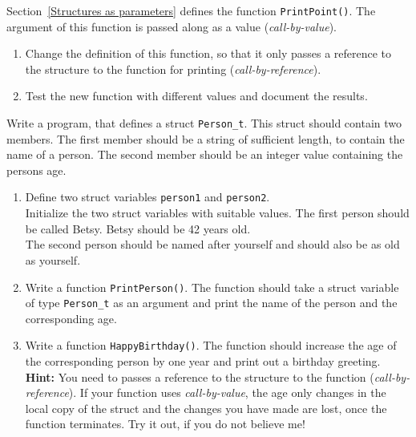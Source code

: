 

\begin{exercise}

Section~\ref{Structures as parameters} defines the function {\tt PrintPoint()}. 
The argument of this function is passed along as a value (\emph{call-by-value}).

\begin{enumerate}
\item Change the definition of this function, so that it only passes a reference to 
the structure to the function for printing (\emph{call-by-reference}).

\item Test the new function with different values and document the results. 
\end{enumerate}


\end{exercise}



\begin{exercise}

Write a program, that defines a struct \texttt{Person\_t}.
This struct should contain two members. The first member should be a string
of sufficient length, to contain the name of a person. The second member should
be an integer value containing the persons age. 

\begin{enumerate}
\item Define two struct variables \texttt{person1} and \texttt{person2}.\\ 
Initialize the two struct variables with suitable values. The first person
should be called Betsy. Betsy should be 42 years old.\\
The second person should be named after yourself and should also be as old as yourself.


\item Write a function \texttt{PrintPerson()}. The function should take a struct variable of type
\texttt{Person\_t} as an argument and print the name of the person and the corresponding age.
\item Write a function \texttt{HappyBirthday()}. The function should increase the age of the 
corresponding person by one year and print out a birthday greeting.\\
\textbf{Hint: }You need to passes a reference to the structure to the function (\emph{call-by-reference}). 
If your function uses \emph{call-by-value}, the age only changes in the local copy of the struct and
the changes you have made are lost, once the function terminates. Try it out, if you do not believe me!
\end{enumerate}


\end{exercise}



